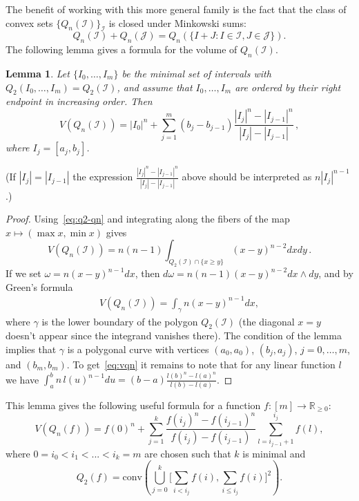 \documentclass[a4paper,reqno,12pt]{amsart}
\newtheorem{lemma}[theorem]{Lemma}
\newcommand{\I}{\mathscr{I}}
\newcommand{\J}{\mathscr{J}}
\renewcommand{\r}{\mathbb{R}}
\newcommand{\1}{\bo{1}}
\begin{document}
The benefit of working with this more general family is the fact that the class of convex sets $\{Q_n(\I)\}_{\I}$ is closed under Minkowski sums:
    \[Q_n(\I)+Q_n(\J)=Q_n(\{I+J\colon I\in\I, J\in\J\}).\]
The following lemma gives a formula for the volume of $Q_n(\I)$.
\begin{lemma} \label{lem:vqn}
Let $\{I_0,\dots,I_m\}$ be the minimal set of intervals with $Q_2(I_0,\dots,I_m)=Q_2(\I)$, and assume that $I_0,\dots,I_m$ are ordered by their right endpoint in increasing order. Then
	\begin{equation} \label{eq:vqn}
 V(Q_n(\I)) = |I_0|^n
	 + \sum_{j=1}^{m}(b_{j}-b_{j-1})\frac{|I_{j}|^n-|I_{j-1}|^n}{|I_{j}|-|I_{j-1}|}\,,
    \end{equation}
where $I_j=[a_j,b_j]$.
\end{lemma}
(If $|I_j|=|I_{j-1}|$ the expression $\frac{|I_j|^n-|I_{j-1}|^n}{|I_j|-|I_{j-1}|}$ above should be interpreted as $n|I_j|^{n-1}$.)
\begin{proof}
Using~\eqref{eq:q2-qn} and integrating along the fibers of the map $x\mapsto (\max x, \min x)$ gives
	\[V(Q_n(\I)) = n(n-1)\int_{Q_2(\I)\cap\{x\ge y\}}(x-y)^{n-2}dx dy\,.\]
If we set $\omega = n(x-y)^{n-1}dx$, then $d\omega = n(n-1)(x-y)^{n-2}dx\wedge dy$, and by Green's formula 
	\begin{align}\label{id:volintegral}
	    V(Q_n(\I)) = \int_{\gamma}n(x-y)^{n-1}dx,
	\end{align}
where $\gamma$ is the lower boundary of the polygon $Q_2(\I)$ (the diagonal $x=y$ doesn't appear since the integrand vanishes there). The condition of the lemma implies that $\gamma$ is a polygonal curve with vertices $(a_0,a_0)$, $(b_j,a_j)$, $j=0,\dots,m$, and $(b_m,b_m)$. To get~\eqref{eq:vqn} it remains to note that for any linear function $l$ we have $\int_{a}^{b}n\,l(u)^{n-1}du = (b-a)\frac{l(b)^n-l(a)^n}{l(b)-l(a)}$. 
\end{proof}
This lemma gives the following useful formula for a function $f:[m]\to\r_{\geq 0}$:
	\begin{equation} \label{eq:volumeqf}
	V(Q_n(f)) =  f(0)^n 
    + \sum_{j=1}^{k}\frac{f(i_j)^n-f(i_{j-1})^n}{f(i_j)-f(i_{j-1})}\sum_{l=i_{j-1}+1}^{i_j}f(l),
	\end{equation}
   where $0=i_0<i_1<...<i_k=m$ are chosen such that $k$ is minimal and
    \[
    Q_2(f)=\mathrm{conv}\left(\bigcup_{j=0}^k \bigg[ \sum_{i< i_{j}} f(i), \sum_{i\leq i_{j}} f(i)\bigg]^2\right).
    \]
\end{document}

